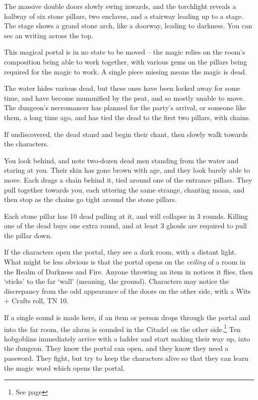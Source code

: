 \begin{multicols}{2}
\begin{boxtext}

	The massive double doors slowly swing inwards, and the torchlight reveals a hallway of six stone pillars, two enclaves, and a stairway leading up to a stage.  The stage shows a grand stone arch, like a doorway, leading to darkness.
	You can see an writing across the top.

\end{boxtext}

This magical portal is in no state to be moved -- the magic relies on the room's composition being able to work together, with various gems on the pillars being required for the magic to work.
A single piece missing means the magic is dead.

The water hides various dead, but these ones have been locked away for some time, and have become mummified by the peat, and so mostly unable to move.  The dungeon's necromancer has planned for the party's arrival, or someone like them, a long time ago, and has tied the dead to the first two pillars, with chains.

If undiscovered, the dead stand and begin their chant, then slowly walk towards the characters.

\begin{boxtext}
	You look behind, and note two-dozen dead men standing from the water and staring at you.
	Their skin has gone brown with age, and they look barely able to move.
	Each drags a chain behind it, tied around one of the entrance pillars.
	They pull together towards you, each uttering the same strange, chanting moan, and then stop as the chains go tight around the stone pillars.
\end{boxtext}

Each stone pillar has 10 dead pulling at it, and will collapse in 3 rounds.  Killing one of the dead buys one extra round, and at least 3 ghouls are required to pull the pillar down.

If the characters open the portal, they see a dark room, with a distant light.  What might be less obvious is that the portal opens on the \emph{ceiling} of a room in the Realm of Darkness and Fire.  Anyone throwing an item in notices it flies, then `sticks' to the far `wall' (meaning, the ground).  Characters may notice the discrepancy from the odd appearance of the doors on the other side, with a Wits + Crafts roll, TN 10.

If a single sound is made here, if an item or person drops through the portal and into the far room, the alarm is sounded in the Citadel on the other side.\footnote{See page \pageref{darknessandfire}}
Ten hobgoblins immediately arrive with a ladder and start making their way up, into the dungeon.
They know the portal can open, and they know they need a password.
They fight, but try to keep the characters alive so that they can learn the magic word which opens the portal.


\end{multicols}
